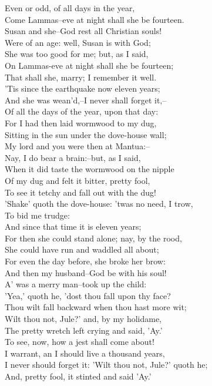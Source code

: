 \begin{speech}
Even or odd, of all days in the year, \\
Come Lammas--eve at night shall she be fourteen. \\
Susan and she--God rest all Christian souls! \\
Were of an age: well, Susan is with God; \\
She was too good for me; but, as I said, \\
On Lammas-eve at night shall she be fourteen; \\
That shall she, marry; I remember it well. \\
'Tis since the earthquake now eleven years; \\
And she was wean'd,--I never shall forget it,-- \\
Of all the days of the year, upon that day: \\
For I had then laid wormwood to my dug, \\
Sitting in the sun under the dove-house wall; \\
My lord and you were then at Mantua:-- \\
Nay, I do bear a brain:--but, as I said, \\
When it did taste the wormwood on the nipple \\
Of my dug and felt it bitter, pretty fool, \\
To see it tetchy and fall out with the dug! \\
'Shake' quoth the dove-house: 'twas no need, I trow, \\
To bid me trudge: \\
And since that time it is eleven years; \\
For then she could stand alone; nay, by the rood, \\
She could have run and waddled all about; \\
For even the day before, she broke her brow: \\
And then my husband--God be with his soul! \\
A' was a merry man--took up the child: \\
'Yea,' quoth he, 'dost thou fall upon thy face? \\
Thou wilt fall backward when thou hast more wit; \\
Wilt thou not, Jule?' and, by my holidame, \\
The pretty wretch left crying and said, 'Ay.' \\
To see, now, how a jest shall come about! \\
I warrant, an I should live a thousand years, \\
I never should forget it: 'Wilt thou not, Jule?' quoth he; \\
And, pretty fool, it stinted and said 'Ay.' \\
\end{speech}
